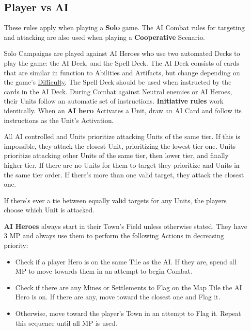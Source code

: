 \begin{multicols}{2}
\subsection*{\hypertarget{AIrules}{Player vs AI}}
These rules apply when playing a \textbf{Solo} game.
The AI Combat rules for targeting and attacking are also used when playing a \textbf{Cooperative} Scenario.\par
Solo Campaigns are played against AI Heroes who use two automated Decks to play the game: the AI Deck, and the Spell Deck.
The AI Deck consists of cards that are similar in function to Abilities and Artifacts, but change depending on the game's \hyperlink{Difficulty}{Difficulty}.
The Spell Deck should be used when instructed by the cards in the AI Deck.
During Combat against Neutral enemies or AI Heroes, their Units follow an automatic set of instructions.
\textbf{Initiative rules} work identically.
When an \textbf{AI hero} Activates a Unit, draw an AI Card and follow its instructions as the Unit's Activation.\par
All AI controlled  and  Units prioritize attacking Units of the same tier.
If this is impossible, they attack the closest Unit, prioritizing the lowest tier one.
 Units prioritize attacking other  Units of the same tier, then lower tier, and finally higher tier.
If there are no  Units for them to target they prioritize  and  Units in the same tier order.
If there's more than one valid target, they attack the closest one.\par
If there's ever a tie between equally valid targets for any Units, the players choose which Unit is attacked.

\textbf{AI Heroes} always start in their Town's Field unless otherwise stated.
They have 3 MP and always use them to perform the following Actions in decreasing priority:
\begin{itemize}
  \item Check if a player Hero is on the same Tile as the AI.
    If they are, spend all MP to move towards them in an attempt to begin Combat.
  \item Check if there are any Mines or Settlements to Flag on the Map Tile the AI Hero is on.
    If there are any, move toward the closest one and Flag it.
  \item Otherwise, move toward the player's Town in an attempt to Flag it.
Repeat this sequence until all MP is used.
\end{itemize}


\end{multicols}
